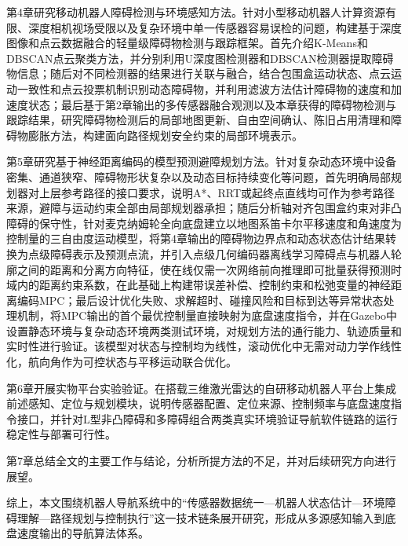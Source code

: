 第4章研究移动机器人障碍检测与环境感知方法。针对小型移动机器人计算资源有限、深度相机视场受限以及复杂环境中单一传感器容易误检的问题，构建基于深度图像和点云数据融合的轻量级障碍物检测与跟踪框架。首先介绍K-Means和DBSCAN点云聚类方法，并分别利用U深度图检测器和DBSCAN检测器提取障碍物信息；随后对不同检测器的结果进行关联与融合，结合包围盒运动状态、点云运动一致性和点云投票机制识别动态障碍物，并利用滤波方法估计障碍物的速度和加速度状态；最后基于第2章输出的多传感器融合观测以及本章获得的障碍物检测与跟踪结果，研究障碍物检测后的局部地图更新、自由空间确认、陈旧占用清理和障碍物膨胀方法，构建面向路径规划安全约束的局部环境表示。

第5章研究基于神经距离编码的模型预测避障规划方法。针对复杂动态环境中设备密集、通道狭窄、障碍物形状复杂以及动态目标持续变化等问题，首先明确局部规划器对上层参考路径的接口要求，说明A*、RRT或起终点直线均可作为参考路径来源，避障与运动约束全部由局部规划器承担；随后分析轴对齐包围盒约束对非凸障碍的保守性，针对麦克纳姆轮全向底盘建立以地图系笛卡尔平移速度和角速度为控制量的三自由度运动模型，将第4章输出的障碍物边界点和动态状态估计结果转换为点级障碍表示及预测点流，并引入点级几何编码器离线学习障碍点与机器人轮廓之间的距离和分离方向特征，使在线仅需一次网络前向推理即可批量获得预测时域内的距离约束系数，在此基础上构建带误差补偿、控制约束和松弛变量的神经距离编码MPC；最后设计优化失败、求解超时、碰撞风险和目标到达等异常状态处理机制，将MPC输出的首个最优控制量直接映射为底盘速度指令，并在Gazebo中设置静态环境与复杂动态环境两类测试环境，对规划方法的通行能力、轨迹质量和实时性进行验证。该模型对状态与控制均为线性，滚动优化中无需对动力学作线性化，航向角作为可控状态与平移运动联合优化。

第6章开展实物平台实验验证。在搭载三维激光雷达的自研移动机器人平台上集成前述感知、定位与规划模块，说明传感器配置、定位来源、控制频率与底盘速度指令接口，并针对L型非凸障碍和多障碍组合两类真实环境验证导航软件链路的运行稳定性与部署可行性。

第7章总结全文的主要工作与结论，分析所提方法的不足，并对后续研究方向进行展望。

综上，本文围绕机器人导航系统中的“传感器数据统一—机器人状态估计—环境障碍理解—路径规划与控制执行”这一技术链条展开研究，形成从多源感知输入到底盘速度输出的导航算法体系。
